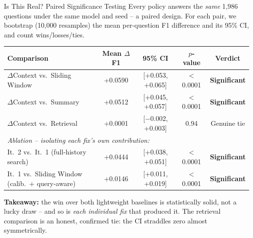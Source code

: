\documentclass[aspectratio=169]{beamer}
\begin{document}
\begin{frame}{Is This Real? Paired Significance Testing}
    Every policy answers the \emph{same} 1{,}986 questions under the same model and seed -- a paired design. For each pair, we bootstrap (10{,}000 resamples) the mean per-question F1 difference and its 95\% CI, and count wins/losses/ties.

    \begin{table}
    \centering
    \small
    \begin{tabular}{lcccc}
    \toprule
    Comparison & Mean $\Delta$F1 & 95\% CI & $p$-value & Verdict \\
    \midrule
    $\Delta$Context vs.\ Sliding Window & +0.0590 & [+0.053, +0.065] & $<$0.0001 & \textbf{Significant} \\
    $\Delta$Context vs.\ Summary & +0.0512 & [+0.045, +0.057] & $<$0.0001 & \textbf{Significant} \\
    $\Delta$Context vs.\ Retrieval & +0.0001 & [$-$0.002, +0.003] & 0.94 & Genuine tie \\
    \midrule
    \multicolumn{5}{l}{\small \emph{Ablation -- isolating each fix's own contribution:}} \\
    It.\ 2 vs.\ It.\ 1 (full-history search) & +0.0444 & [+0.038, +0.051] & $<$0.0001 & \textbf{Significant} \\
    It.\ 1 vs.\ Sliding Window (calib.\ + query-aware) & +0.0146 & [+0.011, +0.019] & $<$0.0001 & \textbf{Significant} \\
    \bottomrule
    \end{tabular}
    \end{table}

    \textbf{Takeaway:} the win over both lightweight baselines is statistically solid, not a lucky draw -- and so is \emph{each individual fix} that produced it. The retrieval comparison is an honest, confirmed tie: the CI straddles zero almost symmetrically.
\end{frame}
\end{document}
